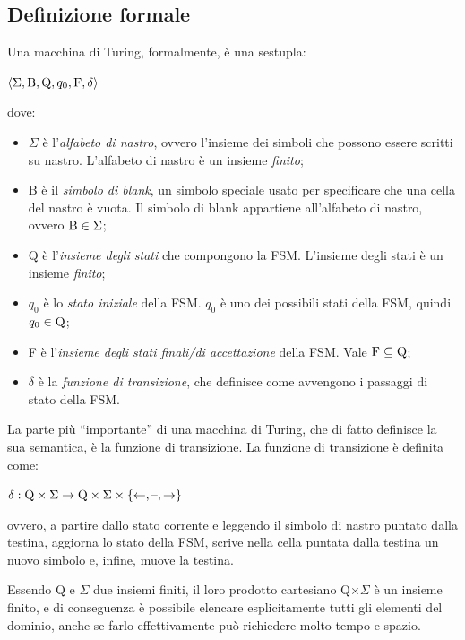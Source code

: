 \subsection*{Definizione formale}
Una macchina di Turing, formalmente, è una sestupla:
\begin{center}
    $\langle \Sigma, \textnormal{B}, \textnormal{Q}, q_0, \textnormal{F}, \delta \rangle$
\end{center}
dove:
\begin{itemize}
    \item $\Sigma$ è l'\textit{alfabeto di nastro}, ovvero l'insieme dei simboli che possono essere scritti su nastro. L'alfabeto di nastro è un insieme \textit{finito};
    \item B è il \textit{simbolo di blank}, un simbolo speciale usato per specificare che una cella del nastro è vuota. Il simbolo di blank appartiene all'alfabeto di nastro, ovvero $\textnormal{B} \in \Sigma$;
    \item Q è l'\textit{insieme degli stati} che compongono la FSM. L'insieme degli stati è un insieme \textit{finito};
    \item $q_0$ è lo \textit{stato iniziale} della FSM. $q_0$ è uno dei possibili stati della FSM, quindi $q_0 \in \textnormal{Q}$;
    \item F è l'\textit{insieme degli stati finali/di accettazione} della FSM. Vale $\textnormal{F} \subseteq \textnormal{Q}$;
    \item $\delta$ è la \textit{funzione di transizione}, che definisce come avvengono i passaggi di stato della FSM.
\end{itemize}

La parte più “importante” di una macchina di Turing, che di fatto definisce la sua semantica, è la funzione di transizione.
La funzione di transizione è definita come:
\begin{center}
    $\delta: \textnormal{Q} \times \Sigma \rightarrow \textnormal{Q} \times \Sigma \times \left\{ \leftarrow, \textnormal{\textendash}, \rightarrow \right\}$
\end{center}
ovvero, a partire dallo stato corrente e leggendo il simbolo di nastro puntato dalla testina, aggiorna lo stato della FSM, scrive nella cella puntata dalla testina un nuovo simbolo e, infine, muove la testina.

Essendo Q e $\Sigma$ due insiemi finiti, il loro prodotto cartesiano Q$\times \Sigma$ è un insieme finito, e di conseguenza è possibile elencare esplicitamente tutti gli elementi del dominio, anche se farlo effettivamente può richiedere molto tempo e spazio.

